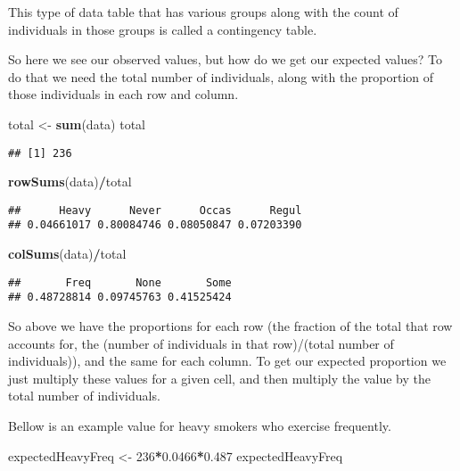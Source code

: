 \documentclass[
]{article}
\newenvironment{Shaded}{\begin{snugshade}}{\end{snugshade}}
\newcommand{\DecValTok}[1]{\textcolor[rgb]{0.00,0.00,0.81}{#1}}
\newcommand{\FloatTok}[1]{\textcolor[rgb]{0.00,0.00,0.81}{#1}}
\newcommand{\KeywordTok}[1]{\textcolor[rgb]{0.13,0.29,0.53}{\textbf{#1}}}
\newcommand{\NormalTok}[1]{#1}
\newcommand{\OperatorTok}[1]{\textcolor[rgb]{0.81,0.36,0.00}{\textbf{#1}}}
\newcommand{\StringTok}[1]{\textcolor[rgb]{0.31,0.60,0.02}{#1}}
\begin{document}
This type of data table that has various groups along with the count of
individuals in those groups is called a contingency table.

So here we see our observed values, but how do we get our expected
values? To do that we need the total number of individuals, along with
the proportion of those individuals in each row and column.

\begin{Shaded}
\begin{Highlighting}[]
\NormalTok{total \textless{}{-}}\StringTok{ }\KeywordTok{sum}\NormalTok{(data)}
\NormalTok{total}
\end{Highlighting}
\end{Shaded}

\begin{verbatim}
## [1] 236
\end{verbatim}

\begin{Shaded}
\begin{Highlighting}[]
\KeywordTok{rowSums}\NormalTok{(data)}\OperatorTok{/}\NormalTok{total}
\end{Highlighting}
\end{Shaded}

\begin{verbatim}
##      Heavy      Never      Occas      Regul 
## 0.04661017 0.80084746 0.08050847 0.07203390
\end{verbatim}

\begin{Shaded}
\begin{Highlighting}[]
\KeywordTok{colSums}\NormalTok{(data)}\OperatorTok{/}\NormalTok{total}
\end{Highlighting}
\end{Shaded}

\begin{verbatim}
##       Freq       None       Some 
## 0.48728814 0.09745763 0.41525424
\end{verbatim}

So above we have the proportions for each row (the fraction of the total
that row accounts for, the (number of individuals in that row)/(total
number of individuals)), and the same for each column. To get our
expected proportion we just multiply these values for a given cell, and
then multiply the value by the total number of individuals.

Bellow is an example value for heavy smokers who exercise frequently.

\begin{Shaded}
\begin{Highlighting}[]
\NormalTok{expectedHeavyFreq \textless{}{-}}\StringTok{ }\DecValTok{236}\OperatorTok{*}\FloatTok{0.0466}\OperatorTok{*}\FloatTok{0.487}
\NormalTok{expectedHeavyFreq}
\end{Highlighting}
\end{Shaded}
\end{document}
